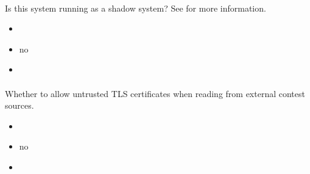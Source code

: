 \documentclass[a4paper,10pt,english,openany]{sphinxmanual}
\begin{document}
\paragraph{}
\label{\detokenize{configuration-reference:shadow-mode}}
\sphinxAtStartPar
Is this system running as a shadow system? See {\hyperref[\detokenize{shadow::doc}]{}} for more information.
\begin{itemize}
\item {} 
\sphinxAtStartPar
{} 

\item {} 
\sphinxAtStartPar
{} no

\item {} 
\sphinxAtStartPar
{} 

\end{itemize}


\paragraph{}
\label{\detokenize{configuration-reference:external-contest-sources-allow-untrusted-certificates}}
\sphinxAtStartPar
Whether to allow untrusted TLS certificates when reading from external contest sources.
\begin{itemize}
\item {} 
\sphinxAtStartPar
{} 

\item {} 
\sphinxAtStartPar
{} no

\item {} 
\sphinxAtStartPar
{} 

\end{itemize}
\end{document}

